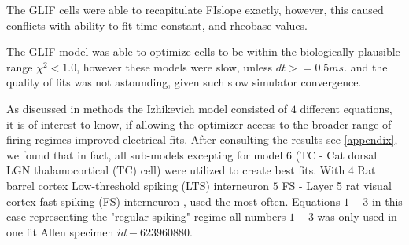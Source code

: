 The GLIF cells were able to recapitulate FIslope exactly, however, this caused conflicts with ability to fit time constant, and rheobase values.

The GLIF model was able to optimize cells to be within the biologically plausible range $\chi^{2}<1.0$, however these models were slow, unless $dt>=0.5ms$. and the quality of fits was not astounding, given such slow simulator convergence.

As discussed in methods the Izhikevich model consisted of $4$ different equations, it is of interest to know, if allowing the optimizer access to the broader range of firing regimes improved electrical fits. After consulting the results see \ref{appendix}, we found that in fact, all sub-models excepting for model $6$ (TC - Cat dorsal LGN thalamocortical (TC) cell) were utilized to create best fits. With $4$ Rat barrel cortex Low-threshold  spiking (LTS) interneuron 
$5$ FS - Layer 5 rat visual cortex fast-spiking (FS) interneuron , used the most often. Equations $1-3$ in this case representing the "regular-spiking" regime all numbers $1-3$ was only used in one fit Allen specimen $id-623960880$.








